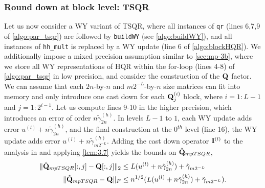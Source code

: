 \subsubsection{Round down at block level: TSQR}\label{sec:mp-3t}
Let us now consider a WY variant of TSQR, where all instances of {\tt qr} (lines 6,7,9 of \cref{algo:par_tsqr}) are followed by {\tt buildWY} (see \cref{algo:buildWY}), and all instances of {\tt hh\_mult} is replaced by a WY update (line 6 of \cref{algo:blockHQR}).
We additionally impose a mixed precision assumption similar to \cref{sec:mp-3b}, where we store all WY representations of HQR within the for-loop (lines 4-8) of \cref{algo:par_tsqr} in low precision, and consider the construction of the $\mathbf{Q}$ factor.
We can assume that each $2n$-by-$n$ and $m2^{-L}$-by-$n$ size matrices can fit into memory and only introduce one cast down for each $\mathbf{Q}_j^{(i)}$ block, where $i=1:L-1$ and $j=1:2^{i-1}$.
Let us compute lines 9-10 in the higher precision, which introduces an error of order $n\tilde{\gamma}_{2n}^{(h)}$.
In levels $L-1$ to $1$, each WY update adds error $u^{(l)}+n\tilde{\gamma}_{2n}^{(h)}$, and the final construction at the $0^{th}$ level (line 16), the WY update adds error $u^{(l)} + n\tilde{\gamma}_{m2^{-L}}^{(h)}$.
Adding the cast down operator $\mathbf{I}^{(l)}$ to the analysis in \cite{Mori2012} and applying \cref{lem:3.7} yields the bounds on $\hat{\mathbf{Q}}_{mpTSQR}$,
\begin{align}
\|\hat{\bb{Q}}_{mpTSQR}[:,j] - \bb{Q}[:,j]\|_2 &\leq L(u^{(l)}+n\tilde{\gamma}_{2n}^{(h)})+\tilde{\gamma}_{m2^{-L}}\label{eqn:mpTSQR1}\\%
\|\hat{\bb{Q}}_{mpTSQR} - \bb{Q}\|_F &\leq n^{1/2}(L(u^{(l)}+n\tilde{\gamma}_{2n}^{(h)})+\tilde{\gamma}_{m2^{-L}}) .\label{eqn:mpTSQR2}
\end{align}

